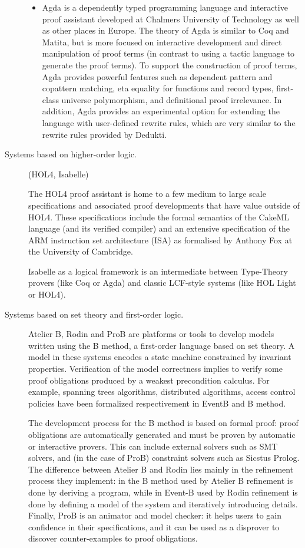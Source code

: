 \begin{description}
\begin{itemize}
    \item Agda is a dependently typed programming language and
    interactive proof assistant developed at Chalmers University of
    Technology as well as other places in Europe. The theory of Agda
    is similar to Coq and Matita, but is more focused on interactive
    development and direct manipulation of proof terms (in contrast to
    using a tactic language to generate the proof terms). To support
    the construction of proof terms, Agda provides powerful features
    such as dependent pattern and copattern matching, eta equality for
    functions and record types, first-class universe polymorphism, and
    definitional proof irrelevance. In addition, Agda provides an
    experimental option for extending the language with user-defined
    rewrite rules, which are very similar to the rewrite rules
    provided by Dedukti.
  \end{itemize}

  \item[Systems based on higher-order logic.] (HOL4, Isabelle)

  The HOL4 proof assistant is home to a few medium to large scale
  specifications and associated proof developments that have value
  outside of HOL4. These specifications include the formal semantics
  of the CakeML language (and its verified compiler) and an extensive
  specification of the ARM instruction set architecture (ISA) as
  formalised by Anthony Fox at the University of Cambridge.

  Isabelle as a logical framework \cite{paulson700} is an intermediate
  between Type-Theory provers (like Coq or Agda) and classic LCF-style
  systems (like HOL Light or HOL4).

  \item[Systems based on set theory and first-order logic.] Atelier B,
  Rodin and ProB are platforms or tools to develop models written
  using the B method, a first-order language based on set theory. A
  model in these systems encodes a state machine constrained by
  invariant properties. Verification of the model correctness implies
  to verify some proof obligations produced by a weakest precondition
  calculus. For example, spanning trees algorithms, distributed
  algorithms, access control policies have been formalized
  respectivement in EventB and B method.

  The development process for the B method is based on formal proof:
  proof obligations are automatically generated and must be proven by
  automatic or interactive provers. This can include external solvers
  such as SMT solvers, and (in the case of ProB) constraint solvers
  such as Sicstus Prolog. The difference between Atelier B and Rodin
  lies mainly in the refinement process they implement: in the B
  method used by Atelier B refinement is done by deriving a program,
  while in Event-B used by Rodin refinement is done by defining a
  model of the system and iteratively introducing details. Finally,
  ProB is an animator and model checker: it helps users to gain
  confidence in their specifications, and it can be used as a
  disprover to discover counter-examples to proof obligations.


\end{description}
